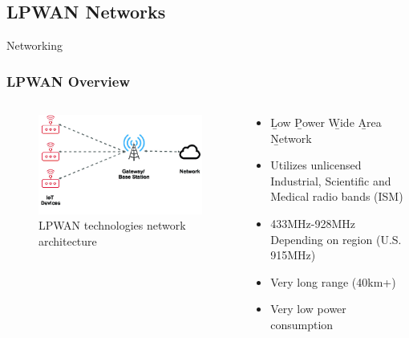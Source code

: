 \documentclass{beamer}
\begin{document}
\subsection{LPWAN Networks}

  \begin{frame}{Networking}
    \frametitle{LPWAN Overview}
    \begin{columns}
      \begin{column}{0.4\textwidth}
        \begin{figure}[htbp]
          \centering
          \includegraphics[width=\textwidth]{LPWAN-technologies-network-architecture.png}
          \caption{LPWAN technologies network architecture \cite{LoRaNetworkFernandez}}
          \label{fig:LPWAN_Network_architecture}
        \end{figure}
      \end{column}
      \begin{column}{0.6\textwidth}
        \begin{itemize}
          \item \b{L}ow \b{P}ower \b{W}ide \b{A}rea \b{N}etwork
          \item Utilizes unlicensed Industrial, Scientific and Medical radio bands (ISM)
          \item 433MHz-928MHz Depending on region (U.S. 915MHz)
          \item Very long range (40km+)
          \item Very low power consumption
        \end{itemize}
      \end{column}
    \end{columns}
  \end{frame}
\end{document}

